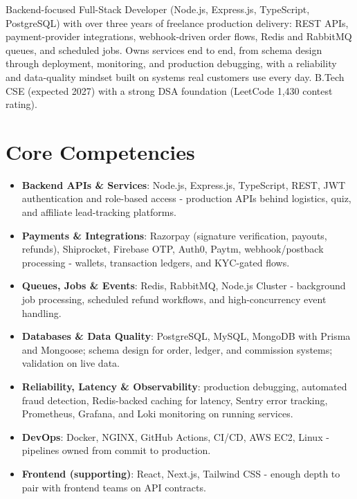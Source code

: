 \documentclass[11pt,a4paper,sans]{moderncv}
\begin{document}
\makecvtitle


\vspace{6pt}
\small{Backend-focused Full-Stack Developer (Node.js, Express.js, TypeScript, PostgreSQL) with over three years of freelance production delivery: REST APIs, payment-provider integrations, webhook-driven order flows, Redis and RabbitMQ queues, and scheduled jobs. Owns services end to end, from schema design through deployment, monitoring, and production debugging, with a reliability and data-quality mindset built on systems real customers use every day. B.Tech CSE (expected 2027) with a strong DSA foundation (LeetCode 1,430 contest rating).}


\section{Core Competencies}
\vspace{1pt}
\begin{itemize}

\item \textbf{Backend APIs \& Services}: Node.js, Express.js, TypeScript, REST, JWT authentication and role-based access - production APIs behind logistics, quiz, and affiliate lead-tracking platforms.

\item \textbf{Payments \& Integrations}: Razorpay (signature verification, payouts, refunds), Shiprocket, Firebase OTP, Auth0, Paytm, webhook/postback processing - wallets, transaction ledgers, and KYC-gated flows.

\item \textbf{Queues, Jobs \& Events}: Redis, RabbitMQ, Node.js Cluster - background job processing, scheduled refund workflows, and high-concurrency event handling.

\item \textbf{Databases \& Data Quality}: PostgreSQL, MySQL, MongoDB with Prisma and Mongoose; schema design for order, ledger, and commission systems; validation on live data.

\item \textbf{Reliability, Latency \& Observability}: production debugging, automated fraud detection, Redis-backed caching for latency, Sentry error tracking, Prometheus, Grafana, and Loki monitoring on running services.

\item \textbf{DevOps}: Docker, NGINX, GitHub Actions, CI/CD, AWS EC2, Linux - pipelines owned from commit to production.

\item \textbf{Frontend (supporting)}: React, Next.js, Tailwind CSS - enough depth to pair with frontend teams on API contracts.

\end{itemize}
\end{document}
